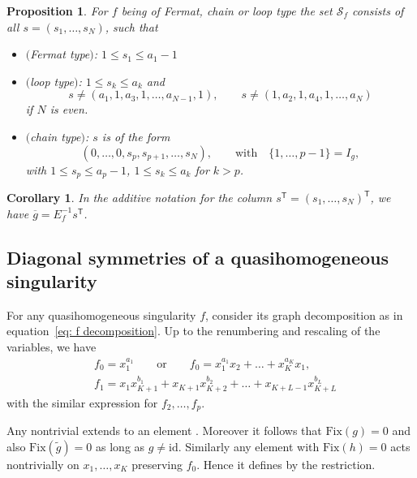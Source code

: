 \documentclass[pdftex]{sigma}
\numberwithin{equation}{section}
\newtheorem{Corollary}[Theorem]{Corollary}
\newtheorem{Proposition}[Theorem]{Proposition}
 { \theoremstyle{definition}
\newtheorem{Definition}[Theorem]{Definition}
\newtheorem{Note}[Theorem]{Note}
\newtheorem{Example}[Theorem]{Example}
\newtheorem{Remark}[Theorem]{Remark} }
\newcommand{\calS}{{\mathcal S}}
\newcommand{\Fix}{\mathrm{Fix}}
\newcommand{\id}{\mathrm{id}}
\begin{document}
\begin{Proposition}\label{proposition: chain loop group structure}
For $f$ being of Fermat, chain or loop type the set $\calS_f$ consists of all $s = (s_1,\dots,s_N)$, such that
	\begin{itemize}\itemsep=0pt
	 \item $($Fermat type$)$: $1 \le s_1 \le a_1-1$
	 \item $($loop type$)$: $1 \le s_k \le a_k$ and
	 \begin{equation*}\label{eq: vanishing r in loop}
		s \neq (a_1,1,a_3,1,\dots, a_{N-1},1), \qquad s \neq (1,a_2,1,a_4,1,\dots, a_{N})
	 \end{equation*}
	 if $N$ is even.
	 \item $($chain type$)$: $s$ is of the form
	 \begin{equation*}%
	 (0,\dots,0,s_p,s_{p+1},\dots,s_{N}), \qquad \text{with} \quad \{1,\dots,p-1\} = I_g,
	 \end{equation*}
	 with $1 \le s_{p} \le a_{p}-1$, $1 \le s_k \le a_k$ for $k > p$.
	\end{itemize}
\end{Proposition}

\begin{Corollary}
	In the additive notation for the column ${s^{\mathsf{T}} = (s_1,\dots,s_N)^{\mathsf{T}}}$, we have ${\overline g = E_f^{-1} s^{\mathsf{T}}}$\!.
\end{Corollary}

\subsection{Diagonal symmetries of a quasihomogeneous singularity}

For any quasihomogeneous singularity $f$, consider its graph decomposition as in equation~\eqref{eq: f decomposition}. Up to the renumbering and rescaling of the variables, we have
\begin{align*}
	& f_0 = x_1^{a_1} \qquad \text{or} \qquad f_0 = x_1^{a_1}x_2 + \dots + x_K^{a_K}x_1,
	\\
	& f_1 = x_1 x_{K+1}^{b_1} + x_{K+1}x_{K+2}^{b_2} + \dots + x_{K+L-1}x_{K+L}^{b_L}
\end{align*}
with the similar expression for $f_2, \dots, f_p$.

Any nontrivial  extends to an element . Moreover it follows that $\Fix(g) = 0$ and also $\Fix(\widetilde g) = 0$ as long as $g\ne\id$. Similarly any element  with $\Fix(h) = 0$ acts nontrivially on $x_1,\dots,x_K$ preserving $f_0$. Hence it defines  by the restriction.
\end{document}
